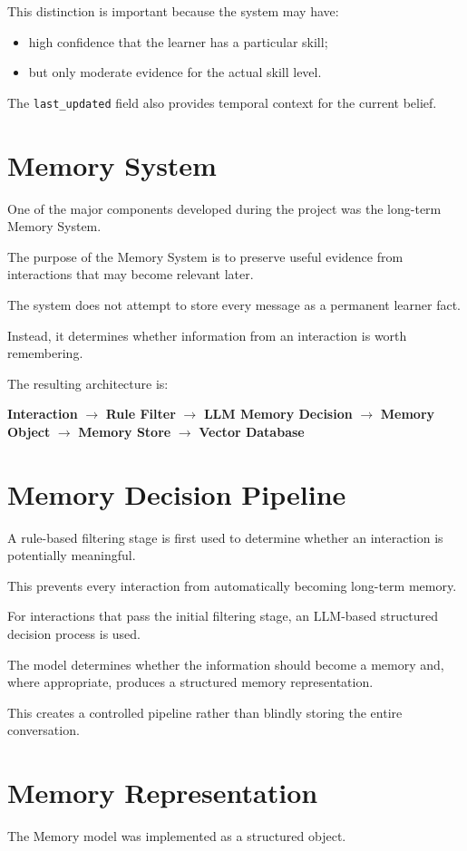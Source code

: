 \documentclass[12pt,a4paper]{article}
\begin{document}
This distinction is important because the system may have:
\begin{itemize}[noitemsep,topsep=2pt]
    \item high confidence that the learner has a particular skill;
    \item but only moderate evidence for the actual skill level.
\end{itemize}

The \texttt{last\_updated} field also provides temporal context for the current belief.

\section{Memory System}
One of the major components developed during the project was the long-term Memory System.

The purpose of the Memory System is to preserve useful evidence from interactions that may become relevant later.

The system does not attempt to store every message as a permanent learner fact.

Instead, it determines whether information from an interaction is worth remembering.

The resulting architecture is:
\begin{center}
\textbf{Interaction} $\rightarrow$ \textbf{Rule Filter} $\rightarrow$ \textbf{LLM Memory Decision} $\rightarrow$ \textbf{Memory Object} $\rightarrow$ \textbf{Memory Store} $\rightarrow$ \textbf{Vector Database}
\end{center}

\section{Memory Decision Pipeline}
A rule-based filtering stage is first used to determine whether an interaction is potentially meaningful.

This prevents every interaction from automatically becoming long-term memory.

For interactions that pass the initial filtering stage, an LLM-based structured decision process is used.

The model determines whether the information should become a memory and, where appropriate, produces a structured memory representation.

This creates a controlled pipeline rather than blindly storing the entire conversation.

\section{Memory Representation}
The Memory model was implemented as a structured object.
\end{document}
